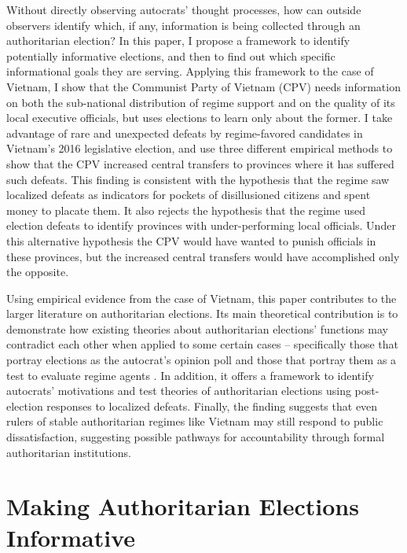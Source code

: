 \documentclass[12pt]{article}
\newcommand{\1}{\mathbbm{1}}
\begin{document}
Without directly observing autocrats' thought processes, how can outside observers identify which, if any, information is being collected through an authoritarian election? In this paper, I propose a framework to identify potentially informative elections, and then to find out which specific informational goals they are serving. Applying this framework to the case of Vietnam, I show that the Communist Party of Vietnam (CPV) needs information on both the sub-national distribution of regime support and on the quality of its local executive officials, but uses elections to learn only about the former. I take advantage of rare and unexpected defeats by regime-favored candidates in Vietnam's 2016 legislative election, and use three different empirical methods to show that the CPV increased central transfers to provinces where it has suffered such defeats. This finding is consistent with the hypothesis that the regime saw localized defeats as indicators for pockets of disillusioned citizens and spent money to placate them. It also rejects the hypothesis that the regime used election defeats to identify provinces with under-performing local officials. Under this alternative hypothesis the CPV would have wanted to punish officials in these provinces, but the increased central transfers would have accomplished only the opposite.

Using empirical evidence from the case of Vietnam, this paper contributes to the larger literature on authoritarian elections. Its main theoretical contribution is to demonstrate how existing theories about authoritarian elections' functions may contradict each other when applied to some certain cases -- specifically those that portray elections as the autocrat's opinion poll \citep[e.g.][]{Miller2015, Magaloni2006, Blaydes2010} and those that portray them as a test to evaluate regime agents \citep[e.g.][]{Magaloni2006, Blaydes2010,Myagkov2009,RundlettSvolik2016}. In addition, it offers a framework to identify autocrats' motivations and test theories of authoritarian elections using post-election responses to localized defeats. Finally, the finding suggests that even rulers of stable authoritarian regimes like Vietnam may still respond to public dissatisfaction, suggesting possible pathways for accountability through formal authoritarian institutions.

\section*{Making Authoritarian Elections Informative}
\label{sec:lit_review}
\end{document}
